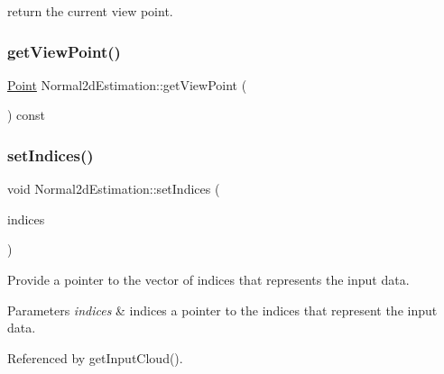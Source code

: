 return the current view point. 

\mbox{\label{classNormal2dEstimation_a9a8b5ac0f03023a476f7986cf06c8f96}} 
\subsubsection{\texorpdfstring{get\+View\+Point()}{getViewPoint()}\hspace{0.1cm}{\footnotesize\ttfamily [2/2]}}
{\footnotesize\ttfamily \hyperlink{Normal2dEstimation_8h_ab8d898f36957cca40634530a6f118a3e}{Point} Normal2d\+Estimation\+::get\+View\+Point (\begin{DoxyParamCaption}{ }\end{DoxyParamCaption}) const\hspace{0.3cm}{\ttfamily [inline]}}

\mbox{\label{classNormal2dEstimation_a91bb44f43f09aa33f3c447cfe2cde6b3}} 
\subsubsection{\texorpdfstring{set\+Indices()}{setIndices()}\hspace{0.1cm}{\footnotesize\ttfamily [1/4]}}
{\footnotesize\ttfamily void Normal2d\+Estimation\+::set\+Indices (\begin{DoxyParamCaption}\item[{const pcl\+::\+Point\+Indices\+::\+Ptr \&}]{indices }\end{DoxyParamCaption})}



Provide a pointer to the vector of indices that represents the input data. 


\begin{DoxyParams}{Parameters}
{\em indices} & indices a pointer to the indices that represent the input data. \\
\hline
\end{DoxyParams}


Referenced by get\+Input\+Cloud().

\mbox{\label{classNormal2dEstimation_a57a561d5d51d42584687dd4a3d29defd}} 

